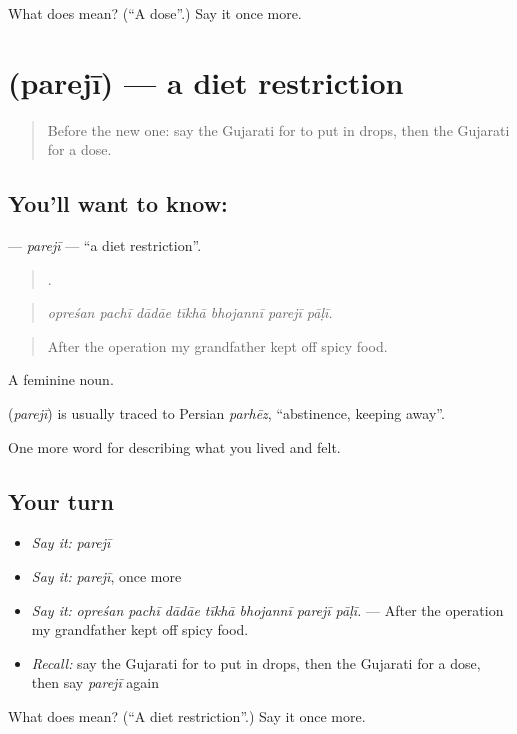 \begin{tcolorbox}[breakable,colback=teal!4,colframe=teal!35!black,title={Before you move on}]
What does  mean? (\textquotedblleft{}A dose\textquotedblright{}.) Say it once more.
\end{tcolorbox}
\section[\texorpdfstring{\gu{પરેજી} (parejī)}{પરેજી (parejī)}]{ (parejī) — a diet restriction}

\label{lesson:GU-C485-pareji}



\begin{quote}
Before the new one: say the Gujarati for to put in drops, then the Gujarati for a dose.
\end{quote}

\subsection*{You'll want to know: }
\textbf{} — \emph{parejī} — \textquotedblleft{}a diet restriction\textquotedblright{}.

\begin{quote}
      .
\end{quote}

\begin{quote}
\emph{opreśan pachī dādāe tīkhā bhojannī parejī pāḷī.}
\end{quote}

\begin{quote}
After the operation my grandfather kept off spicy food.
\end{quote}

A feminine noun.

\begin{cousinweb}
\textbf{} (\emph{parejī}) is usually traced to Persian \emph{parhēz}, \textquotedblleft{}abstinence, keeping away\textquotedblright{}.
\end{cousinweb}

\begin{grammarlens}[title={What you've built}]
One more word for describing what you lived and felt.
\end{grammarlens}

\subsection*{Your turn}
\begin{itemize}
\raggedright
  \item \emph{Say it:} \emph{parejī}
  \item \emph{Say it:} \emph{parejī}, once more
  \item \emph{Say it:} \emph{opreśan pachī dādāe tīkhā bhojannī parejī pāḷī.} — After the operation my grandfather kept off spicy food.
  \item \emph{Recall:} say the Gujarati for to put in drops, then the Gujarati for a dose, then say \emph{parejī} again
\end{itemize}

\begin{tcolorbox}[breakable,colback=teal!4,colframe=teal!35!black,title={Before you move on}]
What does  mean? (\textquotedblleft{}A diet restriction\textquotedblright{}.) Say it once more.
\end{tcolorbox}
